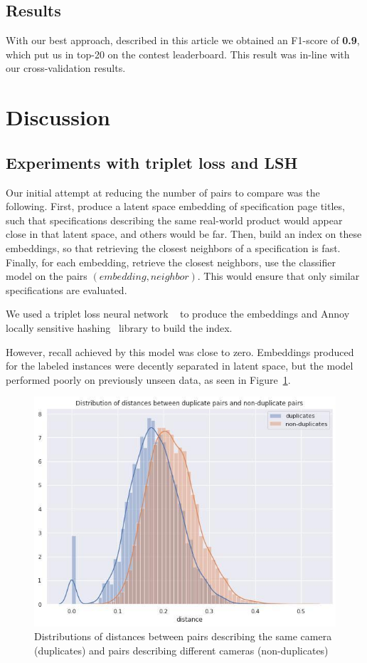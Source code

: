 \documentclass[sigconf]{acmart}
\begin{document}
\subsection{Results}

With our best approach, described in this article we obtained an F1-score of \textbf{0.9}, which put us in top-20 on the contest leaderboard. This result was in-line with our cross-validation results.

\section{Discussion}

\subsection{Experiments with triplet loss and LSH}

Our initial attempt at reducing the number of pairs to compare was the following. First, produce a latent space embedding of specification page titles, such that specifications describing the same real-world product would appear close in that latent space, and others would be far. Then, build an index on these embeddings, so that retrieving the closest neighbors of a specification is fast. Finally, for each embedding, retrieve the closest neighbors, use the classifier model on the pairs $(embedding, neighbor)$. This would ensure that only similar specifications are evaluated.

We used a triplet loss neural network ~\cite{hoffer2015deep} to produce the embeddings and Annoy locally sensitive hashing~\cite{annoy} library to build the index.

However, recall achieved by this model was close to zero. Embeddings produced for the labeled instances were decently separated in latent space, but the model performed poorly on previously unseen data, as seen in Figure~\ref{fig:pairwise_dists}. 

\begin{figure}
\centering
\includegraphics[width=0.9\columnwidth]{../figures/pairwise_dists.jpg}
\caption{Distributions of distances between pairs describing the same camera (duplicates) and pairs describing different cameras (non-duplicates)}
\label{fig:pairwise_dists}
\end{figure} 
\end{document}
